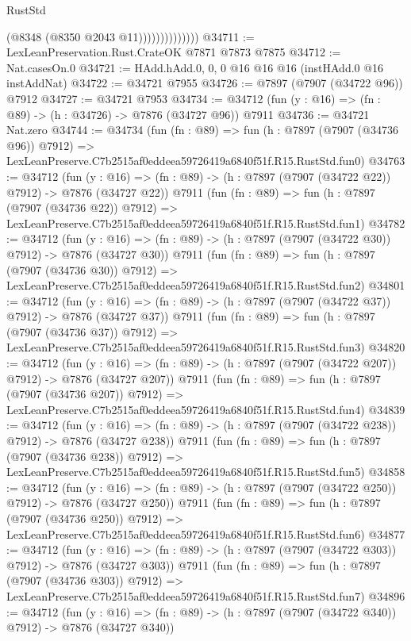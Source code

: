 \begin{lexlean}{RustStd}
\begin{coremodule}
                            (@8348 (@8350 @2043 @11))))))))))))))
@34711 := LexLeanPreservation.Rust.CrateOK @7871 @7873 @7875
@34712 := Nat.casesOn.{0}
@34721 := HAdd.hAdd.{0, 0, 0} @16 @16 @16 (instHAdd.{0} @16 instAddNat)
@34722 := @34721 @7955
@34726 := @7897 (@7907 (@34722 @96)) @7912
@34727 := @34721 @7953
@34734 := @34712 (fun (y : @16) => (fn : @89) -> (h : @34726) -> @7876 (@34727 @96)) @7911
@34736 := @34721 Nat.zero
@34744 := @34734
    (fun (fn : @89) =>
    fun (h : @7897 (@7907 (@34736 @96)) @7912) =>
    LexLeanPreserve.C7b2515af0eddeea59726419a6840f51f.R15.RustStd.fun0)
@34763 := @34712
    (fun (y : @16) => (fn : @89) -> (h : @7897 (@7907 (@34722 @22)) @7912) -> @7876 (@34727 @22))
    @7911
    (fun (fn : @89) =>
    fun (h : @7897 (@7907 (@34736 @22)) @7912) =>
    LexLeanPreserve.C7b2515af0eddeea59726419a6840f51f.R15.RustStd.fun1)
@34782 := @34712
    (fun (y : @16) => (fn : @89) -> (h : @7897 (@7907 (@34722 @30)) @7912) -> @7876 (@34727 @30))
    @7911
    (fun (fn : @89) =>
    fun (h : @7897 (@7907 (@34736 @30)) @7912) =>
    LexLeanPreserve.C7b2515af0eddeea59726419a6840f51f.R15.RustStd.fun2)
@34801 := @34712
    (fun (y : @16) => (fn : @89) -> (h : @7897 (@7907 (@34722 @37)) @7912) -> @7876 (@34727 @37))
    @7911
    (fun (fn : @89) =>
    fun (h : @7897 (@7907 (@34736 @37)) @7912) =>
    LexLeanPreserve.C7b2515af0eddeea59726419a6840f51f.R15.RustStd.fun3)
@34820 := @34712
    (fun (y : @16) => (fn : @89) -> (h : @7897 (@7907 (@34722 @207)) @7912) -> @7876 (@34727 @207))
    @7911
    (fun (fn : @89) =>
    fun (h : @7897 (@7907 (@34736 @207)) @7912) =>
    LexLeanPreserve.C7b2515af0eddeea59726419a6840f51f.R15.RustStd.fun4)
@34839 := @34712
    (fun (y : @16) => (fn : @89) -> (h : @7897 (@7907 (@34722 @238)) @7912) -> @7876 (@34727 @238))
    @7911
    (fun (fn : @89) =>
    fun (h : @7897 (@7907 (@34736 @238)) @7912) =>
    LexLeanPreserve.C7b2515af0eddeea59726419a6840f51f.R15.RustStd.fun5)
@34858 := @34712
    (fun (y : @16) => (fn : @89) -> (h : @7897 (@7907 (@34722 @250)) @7912) -> @7876 (@34727 @250))
    @7911
    (fun (fn : @89) =>
    fun (h : @7897 (@7907 (@34736 @250)) @7912) =>
    LexLeanPreserve.C7b2515af0eddeea59726419a6840f51f.R15.RustStd.fun6)
@34877 := @34712
    (fun (y : @16) => (fn : @89) -> (h : @7897 (@7907 (@34722 @303)) @7912) -> @7876 (@34727 @303))
    @7911
    (fun (fn : @89) =>
    fun (h : @7897 (@7907 (@34736 @303)) @7912) =>
    LexLeanPreserve.C7b2515af0eddeea59726419a6840f51f.R15.RustStd.fun7)
@34896 := @34712
    (fun (y : @16) => (fn : @89) -> (h : @7897 (@7907 (@34722 @340)) @7912) -> @7876 (@34727 @340))

\end{coremodule}
\end{lexlean}
